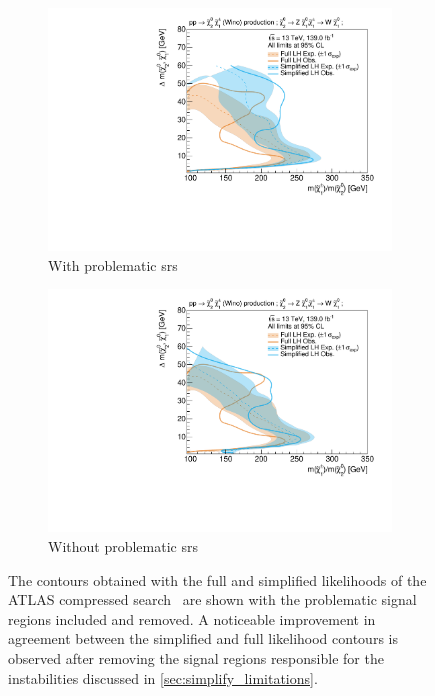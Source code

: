 \begin{figure}
	\centering
	\begin{subfigure}[b]{0.5\textwidth}
		\centering\includegraphics[width=\textwidth]{exclusion_compressed_noCRs_noLabel_v2}
		\caption{With problematic \glspl{sr}\label{fig:exclusion_compressed_CLs_noLabel_v2_withCRs}}
	\end{subfigure}\hfill
	\begin{subfigure}[b]{0.5\textwidth}
		\centering\includegraphics[width=\textwidth]{exclusion_compressed_noLabel_v2}
		\caption{Without problematic \glspl{sr}\label{fig:exclusion_compressed_CLs_noLabel_v2_withoutCRs}}
	\end{subfigure}\hfill
	\caption{The contours obtained with the full and simplified likelihoods of the ATLAS compressed search~\cite{SUSY-2018-16} are shown with the problematic signal regions  included and  removed. A noticeable improvement in agreement between the simplified and full likelihood contours is observed after removing the signal regions responsible for the instabilities discussed in \cref{sec:simplify_limitations}.}\label{fig:limitations_simplied_compressed}
\end{figure}

